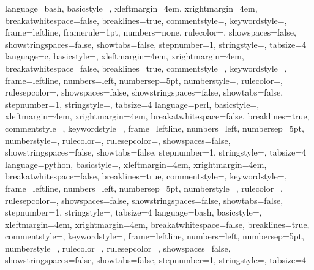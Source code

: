 \usepackage{listings}
\usepackage[usenames,dvipsnames,svgnames]{xcolor} %
\lstset{
    basicstyle=\ttfamily,	%
}
 {
    language=bash,
    basicstyle=\scriptsize\ttfamily,
    xleftmargin=4em,
    xrightmargin=4em,
    breakatwhitespace=false,
    breaklines=true,
    commentstyle=\color[rgb]{0,0.6,0},
    keywordstyle=\color{blue},
    frame=leftline,
    framerule=1pt,
    numbers=none,
    rulecolor=\color{blue},
    showspaces=false,
    showstringspaces=false,
    showtabs=false,
    stepnumber=1,
    stringstyle=\color[rgb]{0.58,0,0.82},
    tabsize=4
}
 {
    language=c,
    basicstyle=\scriptsize\ttfamily,
    xleftmargin=4em,
    xrightmargin=4em,
    breakatwhitespace=false,
    breaklines=true,
    commentstyle=\color[rgb]{0,0.6,0},
    keywordstyle=\color{blue},
    frame=leftline,
    numbers=left,
    numbersep=5pt,
    numberstyle=\small\color[rgb]{0.5,0.5,0.5},
    rulecolor=\color{black},
    rulesepcolor=\color{blue},
    showspaces=false,
    showstringspaces=false,
    showtabs=false,
    stepnumber=1,
    stringstyle=\color[rgb]{0.58,0,0.82},
    tabsize=4
}
 {
    language=perl,
    basicstyle=\scriptsize\ttfamily,
    xleftmargin=4em,
    xrightmargin=4em,
    breakatwhitespace=false,
    breaklines=true,
    commentstyle=\color[rgb]{0,0.6,0},
    keywordstyle=\color{blue},
    frame=leftline,
    numbers=left,
    numbersep=5pt,
    numberstyle=\small\color[rgb]{0.5,0.5,0.5},
    rulecolor=\color{black},
    rulesepcolor=\color{blue},
    showspaces=false,
    showstringspaces=false,
    showtabs=false,
    stepnumber=1,
    stringstyle=\color[rgb]{0.58,0,0.82},
    tabsize=4
}
 {
    language=python,
    basicstyle=\scriptsize\ttfamily,
    xleftmargin=4em,
    xrightmargin=4em,
    breakatwhitespace=false,
    breaklines=true,
    commentstyle=\color[rgb]{0,0.6,0},
    keywordstyle=\color{blue},
    frame=leftline,
    numbers=left,
    numbersep=5pt,
    numberstyle=\small\color[rgb]{0.5,0.5,0.5},
    rulecolor=\color{black},
    rulesepcolor=\color{blue},
    showspaces=false,
    showstringspaces=false,
    showtabs=false,
    stepnumber=1,
    stringstyle=\color[rgb]{0.58,0,0.82},
    tabsize=4
}
 {
    language=bash,
    basicstyle=\scriptsize\ttfamily,
    xleftmargin=4em,
    xrightmargin=4em,
    breakatwhitespace=false,
    breaklines=true,
    commentstyle=\color[rgb]{0,0.6,0},
    keywordstyle=\color{blue},
    frame=leftline,
    numbers=left,
    numbersep=5pt,
    numberstyle=\small\color[rgb]{0.5,0.5,0.5},
    rulecolor=\color{black},
    rulesepcolor=\color{blue},
    showspaces=false,
    showstringspaces=false,
    showtabs=false,
    stepnumber=1,
    stringstyle=\color[rgb]{0.58,0,0.82},
    tabsize=4
}
